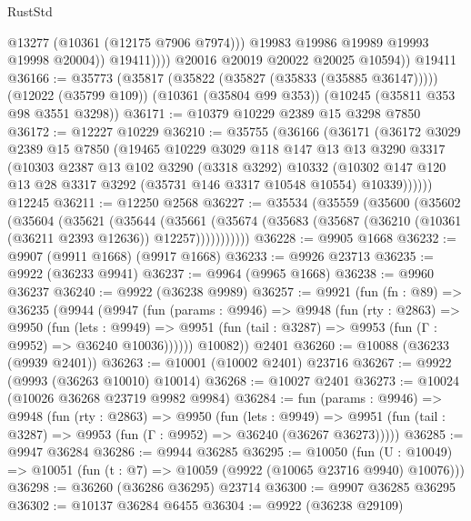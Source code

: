 \begin{lexlean}{RustStd}
\begin{coremodule}
                      @13277
                      (@10361 (@12175 @7906 @7974)))
                    @19983
                    @19986
                    @19989
                    @19993
                    @19998
                    @20004))
                @19411))))
        @20016
        @20019
        @20022
        @20025
        @10594))
    @19411
@36166 := @35773
    (@35817 (@35822 (@35827 (@35833 (@35885 @36147)))))
    (@12022 (@35799 @109))
    (@10361 (@35804 @99 @353))
    (@10245 (@35811 @353 @98 @3551 @3298))
@36171 := @10379 @10229 @2389 @15 @3298 @7850
@36172 := @12227 @10229
@36210 := @35755
    (@36166
      (@36171
        (@36172
          @3029
          @2389
          @15
          @7850
          (@19465
            @10229
            @3029
            @118
            @147
            @13
            @13
            @3290
            @3317
            (@10303
              @2387
              @13
              @102
              @3290
              (@3318 @3292)
              @10332
              (@10302 @147 @120 @13 @28 @3317 @3292 (@35731 @146 @3317 @10548 @10554) @10339))))))
    @12245
@36211 := @12250 @2568
@36227 := @35534
    (@35559
      (@35600
        (@35602
          (@35604
            (@35621
              (@35644
                (@35661
                  (@35674 (@35683 (@35687 (@36210 (@10361 (@36211 @2393 @12636)) @12257)))))))))))
@36228 := @9905 @1668
@36232 := @9907 (@9911 @1668) (@9917 @1668)
@36233 := @9926 @23713
@36235 := @9922 (@36233 @9941)
@36237 := @9964 (@9965 @1668)
@36238 := @9960 @36237
@36240 := @9922 (@36238 @9989)
@36257 := @9921
    (fun (fn : @89) =>
    @36235
      (@9944
        (@9947
          (fun (params : @9946) =>
          @9948
            (fun (rty : @2863) =>
            @9950
              (fun (lets : @9949) =>
              @9951 (fun (tail : @3287) => @9953 (fun (Γ : @9952) => @36240 @10036))))))
        @10082))
    @2401
@36260 := @10088 (@36233 (@9939 @2401))
@36263 := @10001 (@10002 @2401) @23716
@36267 := @9922 (@9993 (@36263 @10010) @10014)
@36268 := @10027 @2401
@36273 := @10024 (@10026 @36268 @23719 @9982 @9984)
@36284 := fun (params : @9946) =>
  @9948
    (fun (rty : @2863) =>
    @9950
      (fun (lets : @9949) =>
      @9951 (fun (tail : @3287) => @9953 (fun (Γ : @9952) => @36240 (@36267 @36273)))))
@36285 := @9947 @36284
@36286 := @9944 @36285
@36295 := @10050
    (fun (U : @10049) => @10051 (fun (t : @7) => @10059 (@9922 (@10065 @23716 @9940) @10076)))
@36298 := @36260 (@36286 @36295) @23714
@36300 := @9907 @36285 @36295
@36302 := @10137 @36284 @6455
@36304 := @9922 (@36238 @29109)

\end{coremodule}
\end{lexlean}
